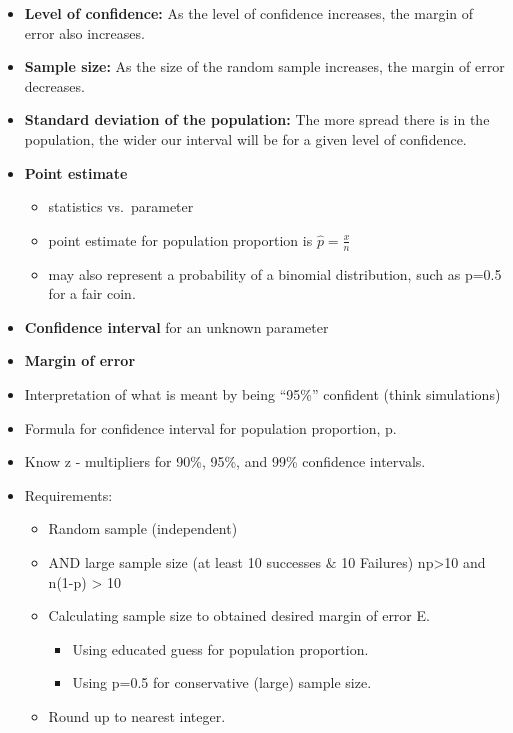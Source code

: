 \documentclass[
]{book}
\providecommand{\tightlist}{%
  \setlength{\itemsep}{0pt}\setlength{\parskip}{0pt}}
\begin{document}
\begin{itemize}
\item
  \textbf{Level of confidence:} As the level of confidence increases, the margin of error also increases.
\item
  \textbf{Sample size:} As the size of the random sample increases, the margin of error decreases.
\item
  \textbf{Standard deviation of the population:} The more spread there is in the population, the wider our interval will be for a given level of confidence.
\item
  \textbf{Point estimate}

  \begin{itemize}
  \tightlist
  \item
    statistics vs.~parameter
  \item
    point estimate for population proportion is \(\hat{p}=\frac{x}{n}\)
  \item
    may also represent a probability of a binomial distribution, such as p=0.5 for a fair coin.
  \end{itemize}
\item
  \textbf{Confidence interval} for an unknown parameter
\item
  \textbf{Margin of error}
\item
  Interpretation of what is meant by being ``95\%'' confident (think simulations)
\item
  Formula for confidence interval for population proportion, p.
\item
  Know z - multipliers for 90\%, 95\%, and 99\% confidence intervals.
\item
  Requirements:

  \begin{itemize}
  \item
    Random sample (independent)
  \item
    AND large sample size (at least 10 successes \(\&\) 10 Failures) np\textgreater10 and n(1-p) \textgreater{} 10
  \item
    Calculating sample size to obtained desired margin of error E.

    \begin{itemize}
    \tightlist
    \item
      Using educated guess for population proportion.
    \item
      Using p=0.5 for conservative (large) sample size.
    \end{itemize}
  \item
    Round up to nearest integer.
  \end{itemize}
\end{itemize}
\end{document}
